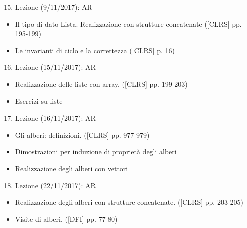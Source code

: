 \documentclass{article}
\providecommand{\tightlist}{%
  \setlength{\itemsep}{0pt}\setlength{\parskip}{0pt}}
\begin{document}
\begin{enumerate}
\setcounter{enumi}{14}
\tightlist
\item
  {Lezione (9/11/2017): AR}
\end{enumerate}

\begin{itemize}
\tightlist
\item
  {Il tipo di dato Lista. Realizzazione con strutture concatenate
  ({[}CLRS{]} pp. 195-199)}
\item
  {Le invarianti di ciclo e la correttezza ({[}CLRS{]} p. 16)}
\end{itemize}

\begin{enumerate}
\setcounter{enumi}{15}
\tightlist
\item
  {Lezione (15/11/2017): AR}
\end{enumerate}

\begin{itemize}
\tightlist
\item
  {Realizzazione delle liste con array. ({[}CLRS{]} pp. 199-203)}
\item
  {Esercizi su liste}
\end{itemize}

\begin{enumerate}
\setcounter{enumi}{16}
\tightlist
\item
  {Lezione (16/11/2017): AR}
\end{enumerate}

\begin{itemize}
\tightlist
\item
  {Gli alberi: definizioni. ({[}CLRS{]} pp. 977-979)}
\item
  {Dimostrazioni per induzione di proprietà degli alberi}
\item
  {Realizzazione degli alberi con vettori}
\end{itemize}

\begin{enumerate}
\setcounter{enumi}{17}
\tightlist
\item
  {Lezione (22/11/2017): AR}
\end{enumerate}

\begin{itemize}
\tightlist
\item
  {Realizzazione degli alberi con strutture concatenate. ({[}CLRS{]} pp.
  203-205)}
\item
  {Visite di alberi. ({[}DFI{]} pp. 77-80)}
\end{itemize}
\end{document}
